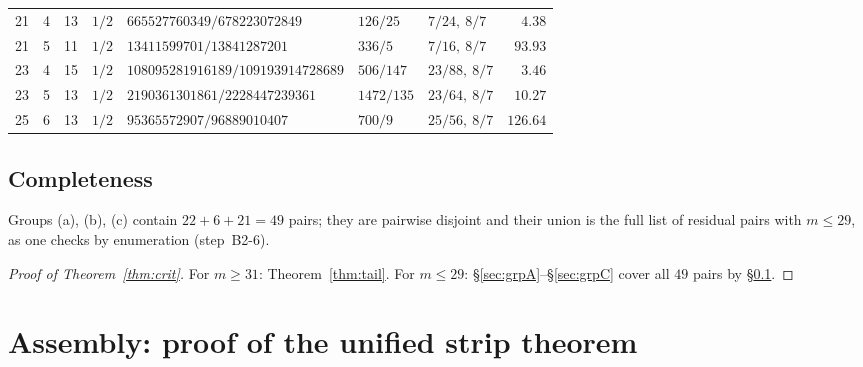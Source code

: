 \documentclass[11pt]{amsart}
\theoremstyle{remark}
\begin{document}
\begin{table}[ht]
\begin{tabular}{@{}rrrllllr@{}}
21&4&13&$1/2$  &$665527760349/678223072849$      &$126/25$ &$7/24,\ 8/7$    &$4.38$\\
21&5&11&$1/2$  &$13411599701/13841287201$        &$336/5$  &$7/16,\ 8/7$    &$93.93$\\
23&4&15&$1/2$  &$108095281916189/109193914728689$&$506/147$&$23/88,\ 8/7$   &$3.46$\\
23&5&13&$1/2$  &$2190361301861/2228447239361$    &$1472/135$&$23/64,\ 8/7$  &$10.27$\\
25&6&13&$1/2$  &$95365572907/96889010407$        &$700/9$  &$25/56,\ 8/7$   &$126.64$\\
\bottomrule
\end{tabular}
\end{table}

\subsection{Completeness}\label{sec:complete}
Groups (a), (b), (c) contain $22+6+21=49$ pairs; they are pairwise disjoint and their union is the full list of residual pairs with $m\le29$, as one checks by enumeration (step~B2-6).

\begin{proof}[Proof of Theorem~\ref{thm:crit}]
For $m\ge31$: Theorem~\ref{thm:tail}.  For $m\le29$: \S\ref{sec:grpA}--\S\ref{sec:grpC} cover all $49$ pairs by \S\ref{sec:complete}.
\end{proof}

\section{Assembly: proof of the unified strip theorem}\label{sec:assembly}
\end{document}
